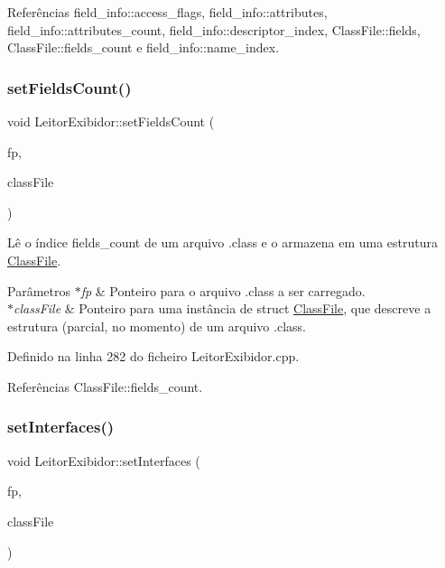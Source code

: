 Referências field\+\_\+info\+::access\+\_\+flags, field\+\_\+info\+::attributes, field\+\_\+info\+::attributes\+\_\+count, field\+\_\+info\+::descriptor\+\_\+index, Class\+File\+::fields, Class\+File\+::fields\+\_\+count e field\+\_\+info\+::name\+\_\+index.

\mbox{\label{classLeitorExibidor_af325d9f6276a66c6bac95b09e83405c9}} 
\subsubsection{\texorpdfstring{set\+Fields\+Count()}{setFieldsCount()}}
{\footnotesize\ttfamily void Leitor\+Exibidor\+::set\+Fields\+Count (\begin{DoxyParamCaption}\item[{F\+I\+LE $\ast$}]{fp,  }\item[{\hyperlink{classClassFile}{Class\+File} $\ast$}]{class\+File }\end{DoxyParamCaption})\hspace{0.3cm}{\ttfamily [private]}}

Lê o índice fields\+\_\+count de um arquivo .class e o armazena em uma estrutura \hyperlink{classClassFile}{Class\+File}. 
\begin{DoxyParams}{Parâmetros}
{\em $\ast$fp} & Ponteiro para o arquivo .class a ser carregado. \\
\hline
{\em $\ast$class\+File} & Ponteiro para uma instância de struct \hyperlink{classClassFile}{Class\+File}, que descreve a estrutura (parcial, no momento) de um arquivo .class. \\
\hline
\end{DoxyParams}


Definido na linha 282 do ficheiro Leitor\+Exibidor.\+cpp.



Referências Class\+File\+::fields\+\_\+count.

\mbox{\label{classLeitorExibidor_aff26e69a60fa1285388e300ac7ec3342}} 
\subsubsection{\texorpdfstring{set\+Interfaces()}{setInterfaces()}}
{\footnotesize\ttfamily void Leitor\+Exibidor\+::set\+Interfaces (\begin{DoxyParamCaption}\item[{F\+I\+LE $\ast$}]{fp,  }\item[{\hyperlink{classClassFile}{Class\+File} $\ast$}]{class\+File }\end{DoxyParamCaption})\hspace{0.3cm}{\ttfamily [private]}}

